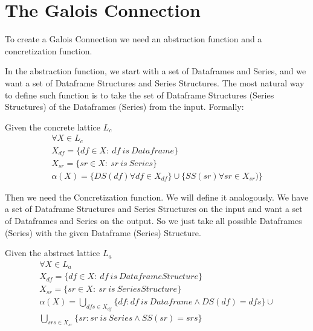 \section{The Galois Connection}

To create a Galois Connection we need an abstraction function and a concretization function.

In the abstraction function, we start with a set of Dataframes and Series, and we want a set of Dataframe Structures and
Series Structures.
The most natural way to define such function is to take the set of Dataframe Structures (Series Structures) of the
Dataframes (Series) from the input.
Formally:

\begin{defn}
    Given the concrete lattice $L_c$
    \begin{gather*}
        \forall X \in L_c \\
        X_{df} = \{df \in X: \: df \: is \: Dataframe\} \\
        X_{sr} = \{sr \in X: \: sr \: is \: Series\} \\
        \alpha(X) = \{DS(df) \forall df \in X_{df}\} \cup \{SS(sr) \forall sr \in X_{sr})\}
    \end{gather*}
\end{defn}

Then we need the Concretization function.
We will define it analogously.
We have a set of Dataframe Structures and Series Structures on the input and want a set of Dataframes and Series
on the output.
So we just take all possible Dataframes (Series) with the given Dataframe (Series) Structure.

\begin{defn}
    Given the abstract lattice $L_a$
    \begin{gather*}
        \forall X \in L_a \\
        X_{df} = \{df \in X: \: df \: is \: Dataframe Structure\} \\
        X_{sr} = \{sr \in X: \: sr \: is \: Series Structure\} \\
        \alpha(X) =
        \bigcup_{dfs \in X_{df}}  \{df: df \: is \: Dataframe \land DS(df) = dfs\}
        \cup \\
        \bigcup_{srs \in X_{sr}} \{sr: sr \: is \: Series \land SS(sr) = srs\}
    \end{gather*}
\end{defn}


